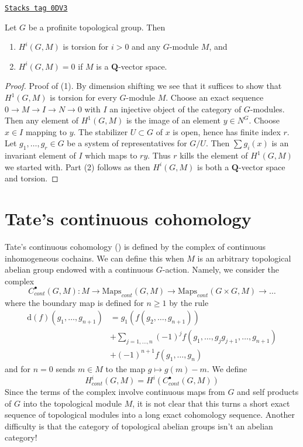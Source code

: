 \begin{lemma}
\label{etale-cohomology-lemma-profinite-group-cohomology-torsion}
\href{https://stacks.math.columbia.edu/tag/0DV3}{\texttt{Stacks tag 0DV3}}

Let $G$ be a profinite topological group.
Then
\begin{enumerate}
\item $H^i(G, M)$ is torsion for $i > 0$ and any $G$-module $M$, and
\item $H^i(G, M) = 0$ if $M$ is a $\mathbf{Q}$-vector space.
\end{enumerate}
\end{lemma}

\begin{proof}
Proof of (1). By dimension shifting we see that it suffices
to show that $H^1(G, M)$ is torsion for every $G$-module $M$.
Choose an exact sequence $0 \to M \to I \to N \to 0$ with $I$
an injective object of the category of $G$-modules.
Then any element of $H^1(G, M)$ is the image of an element
$y \in N^G$. Choose $x \in I$ mapping to $y$.
The stabilizer $U \subset G$ of $x$ is open, hence
has finite index $r$. Let $g_1, \ldots, g_r \in G$ be a system
of representatives for $G/U$. Then $\sum g_i(x)$ is an invariant
element of $I$ which maps to $ry$. Thus $r$ kills the element
of $H^1(G, M)$ we started with. Part (2) follows as then
$H^i(G, M)$ is both a $\mathbf{Q}$-vector space and torsion.
\end{proof}

\section{Tate's continuous cohomology}
\label{etale-cohomology-section-continuous-group-cohomology}
Tate's continuous cohomology (\cite{Tate}) is defined by the complex of
continuous inhomogeneous cochains. We can define this when $M$ is an
arbitrary topological abelian group endowed with a continuous $G$-action.
Namely, we consider the complex
$$
C^\bullet_{cont}(G, M) :
M \to \text{Maps}_{cont}(G, M) \to
\text{Maps}_{cont}(G \times G, M) \to \ldots
$$
where the boundary map is defined for $n \geq 1$ by the rule
\begin{align*}
\text{d}(f)(g_1, \ldots, g_{n + 1})
& = g_1(f(g_2, \ldots, g_{n + 1})) \\
&
+ \sum\nolimits_{j = 1, \ldots, n}
(-1)^jf(g_1, \ldots, g_jg_{j + 1}, \ldots, g_{n + 1}) \\
&
+ (-1)^{n + 1}f(g_1, \ldots, g_n)
\end{align*}
and for $n = 0$ sends $m \in M$ to the map $g \mapsto g(m) - m$. We define
$$
H^i_{cont}(G, M) = H^i(C^\bullet_{cont}(G, M))
$$
Since the terms of the complex involve continuous maps from $G$ and
self products of $G$ into the topological module $M$, it is not clear
that this turns a short exact sequence of topological modules into
a long exact cohomology sequence. Another difficulty is that the category
of topological abelian groups isn't an abelian category!

